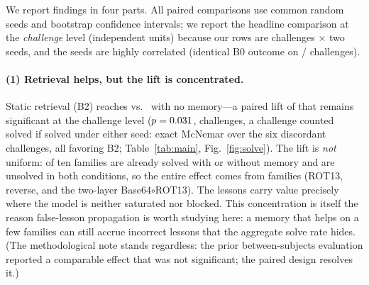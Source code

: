 We report findings in four parts. All paired comparisons use common random seeds
and bootstrap confidence intervals; we report the headline comparison at the
\emph{challenge} level (independent units) because our \Npairs{} rows are
\NchalPairs{} challenges $\times$ two seeds, and the seeds are highly correlated
(identical B0 outcome on \SeedAgree{}/\NchalPairs{} challenges).

\paragraph{(1) Retrieval helps, but the lift is concentrated.}
Static retrieval (B2) reaches \BtwoSolve{} vs.\ \BzeroSolve{} with no memory---a
paired lift of \BtwoLift{} that remains significant at the challenge level
($p=0.031{}$, \NchalPairs{} challenges, a challenge counted solved if
solved under either seed: exact McNemar over the six discordant challenges, all
favoring B2; Table~\ref{tab:main},
Fig.~\ref{fig:solve}). The lift is \emph{not} uniform: \NCeiling{} of ten families
are already solved with or without memory and \NFloor{} are unsolved in both
conditions, so the entire effect comes from \NLift{} families (ROT13, reverse,
and the two-layer Base64$\circ$ROT13). The lessons carry value precisely where the
model is neither saturated nor blocked. This concentration is itself the reason
false-lesson propagation is worth studying here: a memory that helps on a few
families can still accrue incorrect lessons that the aggregate solve rate hides.
(The methodological note stands regardless: the prior between-subjects evaluation
reported a comparable effect that was not significant; the paired design resolves
it.)

\begin{table}[t]\centering\small
\setlength{\tabcolsep}{3.5pt}

\caption{Top: solve rate and challenge-level paired lift over no memory
(B4 is the frozen bandit and does \emph{not} beat B2). Bottom: final learned value
$Q$ of true, poison, and unused (distractor) lessons under each configuration.
The bandit values executed poison indistinguishably from true lessons at this $n$.}
\label{tab:main}
\end{table}

